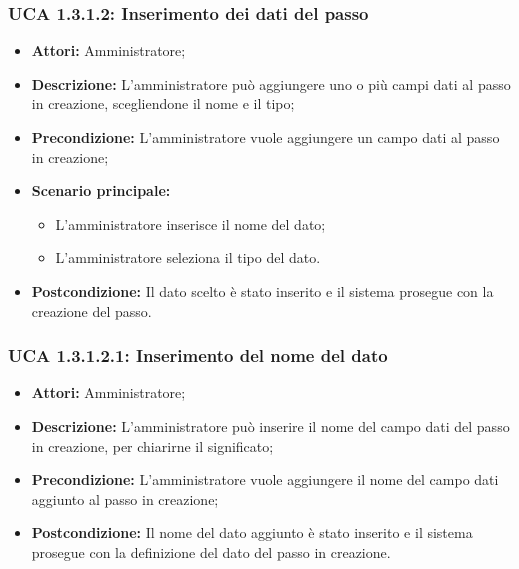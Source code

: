 \subsubsection{UCA 1.3.1.2: Inserimento dei dati del passo}
\begin{itemize}
\item \textbf{Attori:}
 Amministratore;
\item \textbf{Descrizione:} 
L'amministratore può aggiungere uno o più campi dati al passo in creazione, scegliendone il nome e il tipo;
\item \textbf{Precondizione:} 
L'amministratore vuole aggiungere un campo dati al passo in creazione;
\item \textbf{Scenario principale:} 
\begin{itemize}
\item L'amministratore inserisce il nome del dato;
\item L'amministratore seleziona il tipo del dato.
\end{itemize}
\item \textbf{Postcondizione:} 
Il dato scelto è stato inserito e il sistema prosegue con la creazione del passo.
\end{itemize}

\hypertarget{A1.3.1.2.1}{}
\subsubsection{UCA 1.3.1.2.1: Inserimento del nome del dato}
\begin{itemize}
\item \textbf{Attori:}
 Amministratore;
\item \textbf{Descrizione:} 
L'amministratore può inserire il nome del campo dati del passo in creazione, per chiarirne il significato;
\item \textbf{Precondizione:} 
L'amministratore vuole aggiungere il nome del campo dati aggiunto al passo in creazione;
\item \textbf{Postcondizione:} 
Il nome del dato aggiunto è stato inserito e il sistema prosegue con la definizione del dato del passo in creazione.
\end{itemize}

\hypertarget{A1.3.1.2.2}{}
